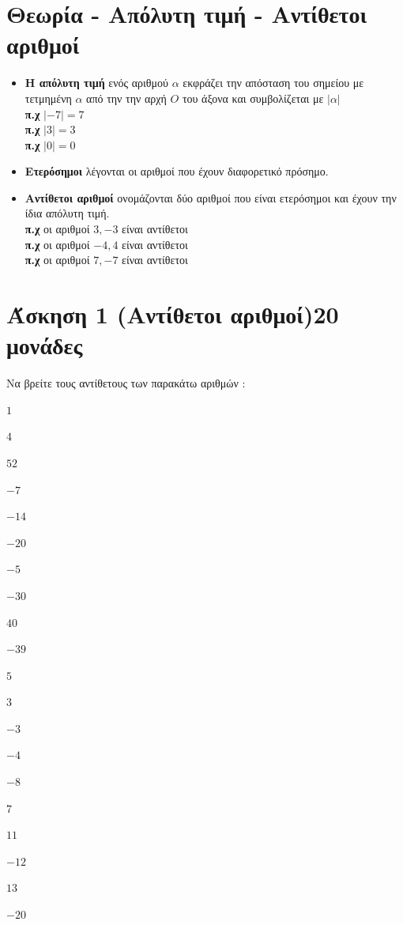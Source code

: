 \documentclass[a4paper,10pt]{report}
\begin{document}
\section*{Θεωρία - Απόλυτη τιμή - Αντίθετοι αριθμοί\hfill \small{}}
\begin{itemize}
 \item \textbf{Η απόλυτη τιμή} ενός αριθμού $α$ εκφράζει την απόσταση του σημείου με τετμημένη $α$ από την 
              την αρχή $Ο$ του άξονα και συμβολίζεται με $|α|$\\
       \textbf{π.χ} $|-7|=7$\\
       \textbf{π.χ} $|3|=3$\\
       \textbf{π.χ} $|0|=0$
\item \textbf{Ετερόσημοι} λέγονται οι αριθμοί που έχουν διαφορετικό πρόσημο. 
\item \textbf{Αντίθετοι αριθμοί} ονομάζονται δύο αριθμοί που είναι ετερόσημοι και έχουν την ίδια απόλυτη τιμή.\\
       \textbf{π.χ} οι αριθμοί $ 3,-3 $ είναι αντίθετοι\\
       \textbf{π.χ} οι αριθμοί $ -4,4 $ είναι αντίθετοι\\
       \textbf{π.χ} οι αριθμοί $ 7,-7 $ είναι αντίθετοι\\
\end{itemize}


\section*{Άσκηση 1  (Αντίθετοι αριθμοί)\hfill \small{20 μονάδες}}
Να βρείτε τους αντίθετους των παρακάτω αριθμών :
\begin{enumerate}[1)]
\begin{multicols}{2}
 \item $1$
 \item $4$
 \item $52$
 \item $-7$
 \item $-14$
 \item $-20$
 \item $-5$
 \item $-30$
 \item $40$
 \item $-39$
 \item $5$
 \item $3$
 \item $-3$
 \item $-4$
 \item $-8$
 \item $7$
 \item $11$
 \item $-12$
 \item $13$
 \item $-20$
\end{multicols}
\end{enumerate}
\end{document}
